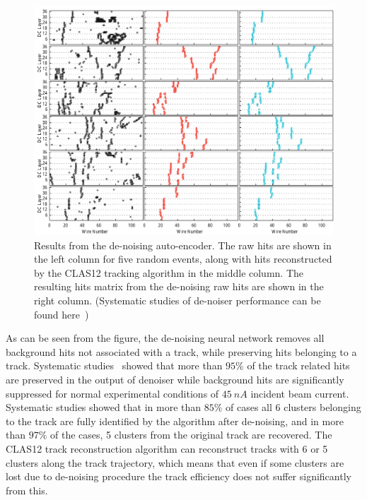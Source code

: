 \begin{figure}[!h]
\begin{center}
 \includegraphics[width=5.8in]{images/cnn_denoise_results.pdf}
\caption {Results from the de-noising auto-encoder. The raw hits are shown
in the left column for five random events, along with hits reconstructed by the 
CLAS12 tracking algorithm in the middle column. The resulting  hits matrix 
from the de-noising raw hits are shown in the right column. (Systematic studies 
of de-noiser performance can be found here~\cite{Thomadakis:2022zcd})}
 \label{network:cnn_results}
 \end{center}
\end{figure}

As can be seen from the figure, the de-noising neural network removes all background hits not 
associated with a track, while preserving hits belonging to a track. 
Systematic studies~\cite{Thomadakis:2022zcd} showed that more than 
$95\%$ of the track related hits are preserved in the output of denoiser while 
background hits are significantly suppressed for normal experimental conditions of $45~nA$
incident beam current. Systematic studies showed that in more than $85\%$ of cases all 
6 clusters belonging to the track are fully identified by the algorithm after de-noising, 
and in more than $97\%$ of the cases, 5 clusters from the original track are recovered. The CLAS12 
track reconstruction algorithm can reconstruct tracks with 6 or 5 clusters along the 
track trajectory, which means that even if some clusters are lost due to de-noising 
procedure the track efficiency does not suffer significantly from this.

